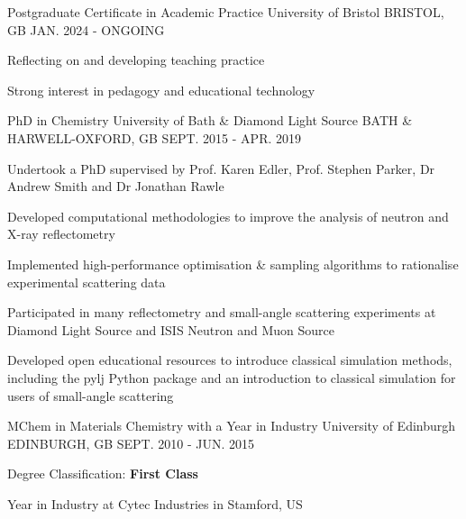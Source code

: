 \begin{cventries}
  \cventry
    {Postgraduate Certificate in Academic Practice}
    {University of Bristol}
    {BRISTOL, GB}
    {JAN. 2024 - ONGOING}
    {
      \begin{cvitems}
        \item {Reflecting on and developing teaching practice}
        \item {Strong interest in pedagogy and educational technology}
      \end{cvitems}
    }
  \cventry
    {PhD in Chemistry}
    {University of Bath \& Diamond Light Source}
    {BATH \& HARWELL-OXFORD, GB}
    {SEPT. 2015 - APR. 2019}
    {
      \begin{cvitems}
        \item {Undertook a PhD supervised by Prof. Karen Edler, Prof. Stephen Parker, Dr Andrew Smith and Dr Jonathan Rawle}
        \item {Developed computational methodologies to improve the analysis of neutron and X-ray reflectometry}
        \item {Implemented high-performance optimisation \& sampling algorithms to rationalise experimental scattering data}
        \item {Participated in many reflectometry and small-angle scattering experiments at Diamond Light Source and ISIS Neutron and Muon Source}
        \item {Developed open educational resources to introduce classical simulation methods, including the pylj Python package and an introduction to classical simulation for users of small-angle scattering}
      \end{cvitems}
    }
  \cventry
    {MChem in Materials Chemistry with a Year in Industry}
    {University of Edinburgh}
    {EDINBURGH, GB}
    {SEPT. 2010 - JUN. 2015}
    {
      \begin{cvitems}
        \item {Degree Classification: \textbf{First Class}}
        \item {Year in Industry at Cytec Industries in Stamford, US}
      \end{cvitems}
    }
\end{cventries}
